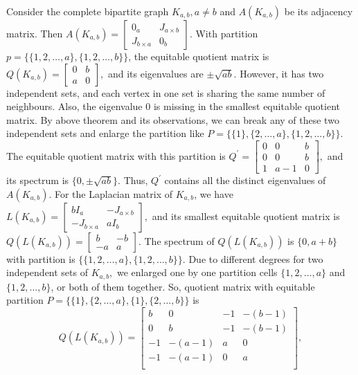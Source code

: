 \documentclass[12pt,twoside]{article}
\begin{document}
Consider the complete bipartite graph $K_{a,b}, a\neq b$ and $A(K_{a,b})$ be its adjacency matrix. Then $A(K_{a,b})=\begin{bmatrix}
0_{a} &J_{a\times b}\\
J_{b\times a} & 0_{b}
\end{bmatrix}.$ With partition $p=\{\{1,2,\dots,a\},\{1,2,\dots,b\}\}$, the equitable quotient matrix is $ Q(K_{a,b})=\begin{bmatrix}
0 & b\\ a & 0
\end{bmatrix},$ and its eigenvalues are $\pm \sqrt{ab}$. However, it has two independent sets, and each vertex in one set is sharing the same number of neighbours. Also, the eigenvalue $0$ is missing in the smallest equitable quotient matrix. By above theorem and its observations, we can break any of these two independent sets and enlarge the partition like $P=\{\{1\},\{2,\dots,a\},\{1,2,\dots,b\}\}.$ The equitable quotient matrix with this partition is $Q^{\prime}=\begin{bmatrix}
0 & 0 & b\\
0 & 0 & b\\
1 & a-1 & 0
\end{bmatrix},$ and its spectrum is $\{0,\pm\sqrt{ab}\}.$ Thus, $Q^{\prime}$ contains all the distinct eigenvalues of $ A(K_{a,b}).$ For the Laplacian matrix of $K_{a,b}$, we have $L(K_{a,b})=\begin{bmatrix}
bI_{a} & -J_{a\times b}\\
-J_{b\times a} & aI_{b}
\end{bmatrix},$ and its smallest equitable quotient matrix is $Q(L(K_{a,b}))=\begin{bmatrix}
b & -b\\ -a & a
\end{bmatrix}.$ The spectrum of $ Q(L(K_{a,b}))$ is $\{0,a+b\}$ with partition is $\{\{1,2,\dots,a\},\{1,2,\dots,b\}\}$. Due to different degrees for two independent sets of $K_{a,b},$ we enlarged one by one partition cells $\{1,2,\dots,a\}$ and $\{1,2,\dots,b\}$, or both of them together. So, quotient matrix with equitable partition $P=\{\{1\},\{2,\dots,a\},\{1\},\{2,\dots,b\}\}$ is 
$$ Q(L(K_{a,b}))=\left[
\begin{array}{cccc}
	b & 0 & -1 & -(b-1) \\
	0 & b & -1 & -(b-1) \\
	-1 & -(a-1) & a & 0 \\
	-1 & -(a-1) & 0 & a \\
\end{array}
\right], $$
\end{document}
